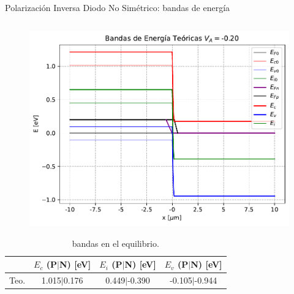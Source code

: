 \documentclass[aspectratio=169,xcolor=dvipsnames]{beamer}
\begin{document}
\begin{frame}{Polarización Inversa Diodo No Simétrico: bandas de energía}
    \begin{columns}
    \begin{column}{0.45\textwidth}
        \vspace{-0.55cm}

        \begin{figure}
            \includegraphics[width=1\linewidth]{Teorico/Bandas_Energia-Inversa.pdf}
        \end{figure}
        \vspace{-0.6cm}
        \begin{table}
            \caption{bandas en el equilibrio.}
            \begin{tabular}{c|ccc}
                & \tiny{$E_c$ (P$|$N)} \tiny{[eV]} & \tiny{$E_i$ (P$|$N)} \tiny{[eV]} & \tiny{$E_v$ (P$|$N)} \tiny{[eV]} \\ \hline

                \tiny{Teo.} & \tiny{1.015$|$0.176} & \tiny{0.449$|$-0.390} & \tiny{-0.105$|$-0.944} \\



\end{tabular}
\end{table}
\end{column}
\end{columns}
\end{frame}
\end{document}
